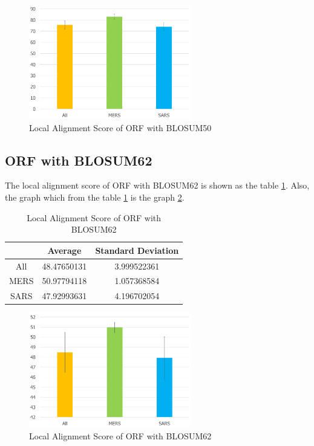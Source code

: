 \documentclass[aps,10pt,a4paper]{article}
\begin{document}
			\begin{figure}[htbp]
				\centering
				\includegraphics[height=5cm]{ORF50}
				\caption{Local Alignment Score of ORF with BLOSUM50}
				\label{fg:orf50}
			\end{figure}
		
		\subsection{ORF with BLOSUM62}
			The local alignment score of ORF with BLOSUM62 is shown as the table \ref{tb:orf62}. Also, the graph which from the table \ref{tb:orf62} is the graph \ref{fg:orf62}. 
			\begin{table}[h!]
				\centering
				\caption{Local Alignment Score of ORF with BLOSUM62}
				\label{tb:orf62}
				\begin{tabular}{ c || c | c }
					& Average & Standard Deviation \\ \hline
					All & 48.47650131 & 3.999522361 \\
					MERS & 50.97794118 & 1.057368584 \\ 
					SARS & 47.92993631 & 4.196702054 \\
				\end{tabular}
			\end{table}
		
			\begin{figure}[htbp]
				\centering
				\includegraphics[height=5cm]{ORF62}
				\caption{Local Alignment Score of ORF with BLOSUM62}
				\label{fg:orf62}
			\end{figure}
		
\end{document}
